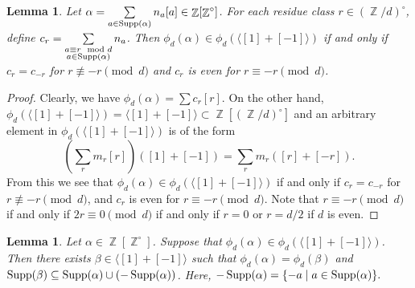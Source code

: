 \documentclass[12t,a4paper]{amsart}
\newtheorem{lem}[thm]{Lemma}
\theoremstyle{definition}
\DeclareMathOperator{\Z}{\mathbb{Z}}
\DeclareMathOperator{\supp}{{\rm Supp}}
\numberwithin{equation}{section}
\begin{document}
{\begin{lem} \label{lem:[-1]+[1]-first}
    Let $\alpha=\sum\limits_{a\in \supp(\alpha)} n_a[a]\in \Z[\Z^{\circ}]$. For each residue class $r\in (\Z/d)^\circ$, define $c_r=\sum\limits_{\substack{a\equiv r\mod d\\ a\in \supp(\alpha)}}n_a$. 
    Then $\phi_d(\alpha)\in \phi_d(\langle [1] + [-1] \rangle)$ if and only if $c_r=c_{-r}$ for $r\not\equiv -r\pmod d$ and $c_r$ is even for $r\equiv -r\pmod d$.
   \end{lem}
   \begin{proof}
       Clearly, we have $\phi_d(\alpha)=\sum c_r[r]$. On the other hand, $\phi_d(\langle [1] + [-1] \rangle)= \langle [1] + [-1] \rangle \subset \Z[(\Z/d)^\circ]$ and an arbitrary element in $\phi_d(\langle [1] + [-1] \rangle)$ is of the form
       \[
       \left(\sum_{r} m_r [r]\right) ([1] + [-1]) = \sum_{r} m_r ([r] + [-r]).
       \]
       From this we see that $\phi_d(\alpha)\in \phi_d(\langle [1] + [-1] \rangle)$ if and only if $c_r=c_{-r}$ for $r\not\equiv -r\pmod d$, and $c_r$ is even for $r\equiv -r\pmod d$. Note that $r\equiv -r\pmod d$ if and only if $2r\equiv 0\pmod d$ if and only if $r=0$ or $r=d/2$ if $d$ is even.
   \end{proof}

\begin{lem} \label{lem:[-1]+[1]-second}
    Let $\alpha\in \Z[\Z^{\circ}]$. Suppose that $\phi_d(\alpha)\in \phi_d(\langle [1] + [-1] \rangle)$. Then there exists $\beta\in \langle [1] + [-1] \rangle$ such that $\phi_d(\alpha)=\phi_d(\beta)$ and $\supp(\beta)\subseteq \supp(\alpha)\cup(-\supp(\alpha))$. Here, $-\supp(\alpha)=\{-a\mid  a\in \supp(\alpha)\}.$
     \end{lem}

}
\end{document}
